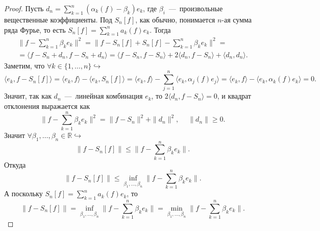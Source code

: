 \begin{proof}
    Пусть $d_n = \sum\limits_{k = 1}^n (\alpha_k(f) - \beta_k) e_k$, где $\beta_i$~---~произвольные вещественные коэффициенты. Под $S_n[f]$, как обычно, понимается $n$-ая сумма ряда Фурье, то есть $S_n[f] = \sum\limits_{k = 1}^n a_k(f)e_k$. Тогда
    \begin{multline*}
        \big\|f - \sum\limits_{k = 1}^n \beta_{k}e_k\big\|^2 = \big\|f - S_n[f] + S_n[f] - \sum\limits_{k = 1}^n \beta_k e_k\big\|^2 = \\ =
        \langle f - S_n + d_n, f - S_n + d_n \rangle = \langle f - S_n, f - S_n \rangle + 2 \langle d_n, f - S_n \rangle + \langle d_n, d_n \rangle.
    \end{multline*}
    Заметим, что $\forall k \in \{1, \ldots, n\} \hookrightarrow$
    \[
        \langle e_k, f - S_n[f] \rangle = \langle e_k, f \rangle - \langle e_k, S_n[f] \rangle = \langle e_k, f \rangle - \sum_{j = 1}^n \langle e_k, \alpha_j(f)e_j \rangle  = \langle e_k, f \rangle - \langle e_k, \alpha_k(f)e_k \rangle = 0.
    \]
    Значит, так как $d_n$~---~линейная комбинация $e_k$, то $2\langle d_n, f - S_n \rangle = 0$, и квадрат отклонения выражается как
    \begin{equation*}
        \big\|f - \sum\limits_{k = 1}^n \beta_k e_k\big\|^2 = \| f - S_n \|^2+ \|d_n \|^2, \quad  \ \|d_n\| \geq 0.
    \end{equation*}
    Значит $\forall \beta_1, \ldots, \beta_n \in \mathbb{R} \hookrightarrow$
    \begin{equation*}
        \big\|f - S_n[f]\big\| \leq \big\|f - \sum\limits_{k = 1}^n \beta_k e_k\big\|.
    \end{equation*}
    Откуда
    \[
        \big\|f - S_n[f]\big\| \leq \inf\limits_{\beta_1, \ldots, \beta_n} \big\|f - \sum\limits_{k = 1}^n \beta_{k}e_k\big\|.
    \]
    А поскольку $S_n[f] = \sum\limits_{k = 1}^n a_k(f)e_k$, то $$\bigr\|f - S_n[f]\bigr\| = \inf\limits_{\beta_1, \ldots, \beta_n} \bigr\|f - \sum\limits_{k = 1}^n \beta_k e_k\bigr\| = \min\limits_{\beta_1, \ldots, \beta_n} \bigr\|f - \sum\limits_{k = 1}^n \beta_k e_k\bigr\|.$$
\end{proof}

